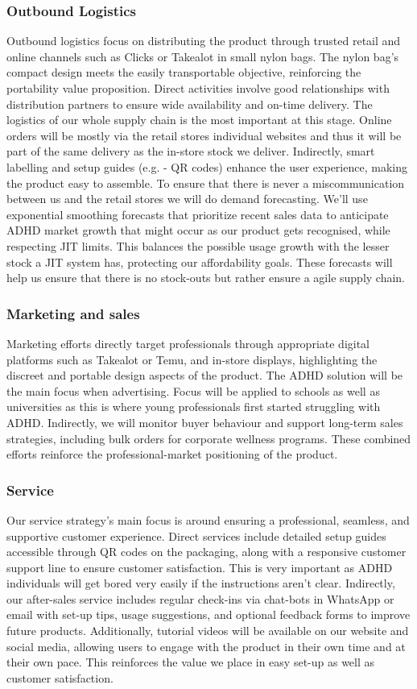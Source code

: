 \documentclass{article}
\begin{document}
  \subsubsection{Outbound Logistics}
  Outbound logistics focus on distributing the product through trusted retail and online channels such as Clicks or Takealot in small nylon bags. The nylon bag’s compact design meets the easily transportable objective, reinforcing the portability value proposition. Direct activities involve good relationships with distribution partners to ensure wide availability and on-time delivery. The logistics of our whole supply chain is the most important at this stage. Online orders will be mostly via the retail stores individual websites and thus it will be part of the same delivery as the in-store stock we deliver. Indirectly, smart labelling and setup guides (e.g. - QR codes) enhance the user experience, making the product easy to assemble. To ensure that there is never a miscommunication between us and the retail stores we will do demand forecasting. We’ll use exponential smoothing forecasts that prioritize recent sales data to anticipate ADHD market growth that might occur as our product gets recognised, while respecting JIT limits. This balances the possible usage growth with the lesser stock a JIT system has, protecting our affordability goals. These forecasts will help us ensure that there is no stock-outs but rather ensure a agile supply chain.
  \subsubsection{Marketing and sales}
  Marketing efforts directly target professionals through appropriate digital platforms such as Takealot or Temu, and in-store displays, highlighting the discreet and portable design aspects of the product. The ADHD solution will be the main focus when advertising. Focus will be applied to schools as well as universities as this is where young professionals first started struggling with ADHD. Indirectly, we will monitor buyer behaviour and support long-term sales strategies, including bulk orders for corporate wellness programs. These combined efforts reinforce the professional-market positioning of the product.
  \subsubsection{Service}
  Our service strategy’s main focus is around ensuring a professional, seamless, and supportive customer experience. Direct services include detailed setup guides accessible through QR codes on the packaging, along with a responsive customer support line to ensure customer satisfaction. This is very important as ADHD individuals will get bored very easily if the instructions aren’t clear. Indirectly, our after-sales service includes regular check-ins via chat-bots in WhatsApp or email with set-up tips, usage suggestions, and optional feedback forms to improve future products. Additionally, tutorial videos will be available on our website and social media, allowing users to engage with the product in their own time and at their own pace. This reinforces the value we place in easy set-up as well as customer satisfaction.
\end{document}
